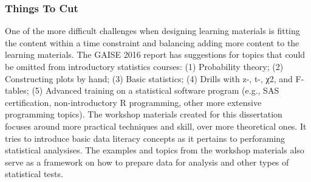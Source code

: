 \documentclass[010-intro.tex]{subfiles}
\begin{document}
\subsubsection{Things To Cut}

    One of the more difficult challenges when designing learning materials is fitting the content within a time constraint
    and balancing adding more content to the learning materials. %
    The GAISE 2016 report has suggestions for topics that could be omitted from introductory statistics courses:
    (1) Probability theory;
    (2) Constructing plots by hand;
    (3) Basic statistics;
    (4) Drills with z-, t-, χ2, and F-tables;
    (5) Advanced training on a statistical software program
        (e.g., SAS certification, non-introductory R programming, other more extensive programming topics).
    The workshop materials created for this dissertation
    focuses around more practical techniques and skill, over more theoretical ones.
    It tries to introduce basic data literacy concepts as it pertains to perforaming statistical analysises.
    The examples and topics from the workshop materials
    also serve as a framework on how to prepare data for analysis and other types of statistical tests.
\end{document}
